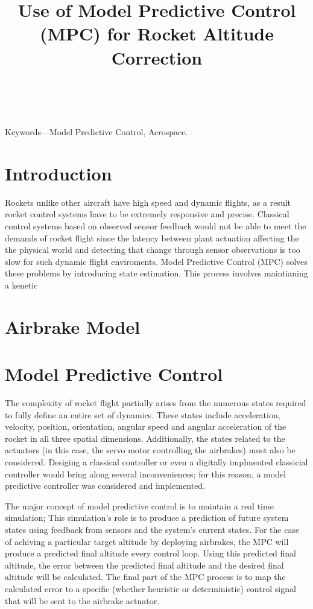 \documentclass[conference, letterpaper]{IEEEtran}
\title{ Use of Model Predictive Control (MPC) for Rocket Altitude Correction }
\author{ \IEEEauthorblockN{Nikhil Peri, Anthony Lin, Manit Ginoya, Paul Buzuloiu } \
\IEEEauthorblockA{uOttawa Rocketry Team \\ \{nperi104, alin102
mgino015, pbuzu025\}@uottawa.ca} }
\begin{document}
\maketitle
\begin{abstract}
\end{abstract}

Keywords—Model Predictive Control, Aerospace.  \section{Introduction}

Rockets unlike other aircraft have high speed and dynamic flights, as a result
rocket control systems have to be extremely responsive and precise. Classical
control systems based on observed sensor feedback would not be able to meet the
demands of rocket flight since the latency between plant actuation affecting the
the physical world and detecting that change through sensor observations is too
slow for such dynamic flight enviroments. Model Predictive Control (MPC) solves
these problems by introducing state estimation.  This process involves maintianing
a kenetic


\section{Airbrake Model}

\section{Model Predictive Control}

The complexity of rocket flight partially arises from the numerous states
required to fully define an entire set of dynamics. These states include
acceleration, velocity, position, orientation, angular speed and angular
acceleration of the rocket in all three spatial dimensions. Additionally,
the states related to the actuators (in this case, the servo motor controlling
the airbrakes) must also be considered. Desiging a classical controller or even
a digitally implmented classicial controller would bring along several
inconveniences; for this reason, a model predictive controller was considered
and implemented.

The major concept of model predictive control is to maintain a real time
simulation; This simulation's role is to produce a prediction of future system
states using feedback from sensors and the system's current states. For the case
of achiving a particular target altitude by deploying airbrakes, the MPC will
produce a predicted final altitude every control loop. Using this predicted
final altitude, the error between the predicted final altitude and the desired
final altitude will be calculated. The final part of the MPC process is to map
the calculated error to a specific (whether heuristic or deterministic) control
signal that will be sent to the airbrake actuator.
\end{document}
